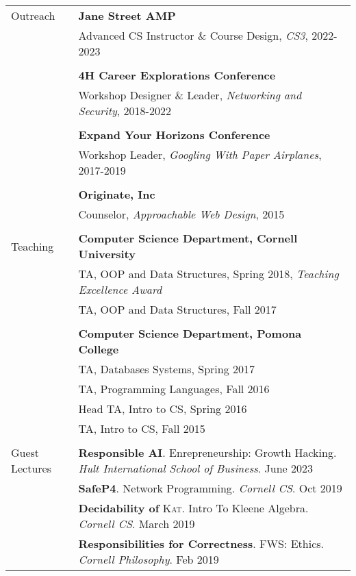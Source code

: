 \documentclass[letterpaper,10pt,oneside]{article}
\begin{document}
\begin{tabular}{@{} l l }
  \Large{Outreach}
  & \textbf{Jane Street AMP} \\
  & Advanced CS Instructor \& Course Design, \emph{CS3}, 2022-2023 \\
  \\

  & \textbf{4H Career Explorations Conference} \\
  & Workshop Designer \& Leader, \emph{Networking and Security}, 2018-2022 \\
  & \\
  & \textbf{Expand Your Horizons Conference} \\
  & Workshop Leader, \emph{Googling With Paper Airplanes}, 2017-2019 \\
  & \\
  & \textbf{Originate, Inc} \\
  & Counselor, \emph{Approachable Web Design}, 2015 \\
  & \\

  \Large{Teaching}
  & \textbf{Computer Science Department, Cornell University} \\
  
  & TA, OOP and Data Structures, Spring 2018, \textit{Teaching Excellence Award} \\
  & TA, OOP and Data Structures, Fall 2017 \\
  &\\
  
  & \textbf{Computer Science Department, Pomona College} \\
  & TA, Databases Systems, Spring 2017 \\
  & TA, Programming Languages, Fall 2016 \\
  & Head TA, Intro to CS, Spring 2016 \\
  & TA, Intro to CS, Fall 2015 \\
  &\\

  \Large{Guest Lectures}
  & \textbf{Responsible AI}. Enrepreneurship: Growth Hacking. \textit{Hult International School of Business}. June 2023\\
  & \textbf{SafeP4}. Network Programming. \textit{Cornell CS}. Oct 2019 \\
  & \textbf{Decidability of }\textsc{Kat}. Intro To Kleene Algebra. \textit{Cornell CS}. March 2019 \\
  & \textbf{Responsibilities for Correctness}. FWS: Ethics. \textit{Cornell Philosophy}. Feb 2019\\

\end{tabular}
\end{document}
